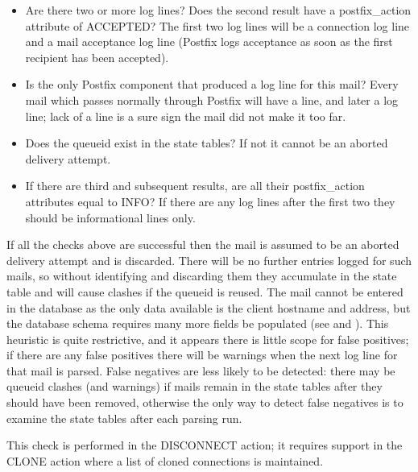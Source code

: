 \begin{itemize}

    \item Are there two or more  log lines?  Does the second
        result have a postfix\_action attribute of ACCEPTED\@?  The first
        two  log lines will be a connection log line and a
        mail acceptance log line (Postfix logs acceptance as soon as the
        first recipient has been accepted).

    \item Is  the only Postfix component that produced a log
        line for this mail?  Every mail which passes normally through
        Postfix will have a  line, and later a
         log line; lack of a  line is a sure
        sign the mail did not make it too far.  

    \item Does the queueid exist in the state tables?  If not it cannot be
        an aborted delivery attempt.

    \item If there are third and subsequent results, are all their
        postfix\_action attributes equal to INFO\@?  If there are any log
        lines after the first two they should be informational lines only.

\end{itemize}

If all the checks above are successful then the mail is assumed to be an
aborted delivery attempt and is discarded.  There will be no further
entries logged for such mails, so without identifying and discarding them
they accumulate in the state table and will cause clashes if the queueid is
reused.  The mail cannot be entered in the database as the only data
available is the client hostname and \IP{} address, but the database schema
requires many more fields be populated (see 
and ).  This heuristic is quite restrictive, and
it appears there is little scope for false positives; if there are any
false positives there will be warnings when the next log line for that mail
is parsed.  False negatives are less likely to be detected: there may be
queueid clashes (and warnings) if mails remain in the state tables after
they should have been removed, otherwise the only way to detect false
negatives is to examine the state tables after each parsing run.

This check is performed in the DISCONNECT action; it requires support in
the CLONE action where a list of cloned connections is maintained.

